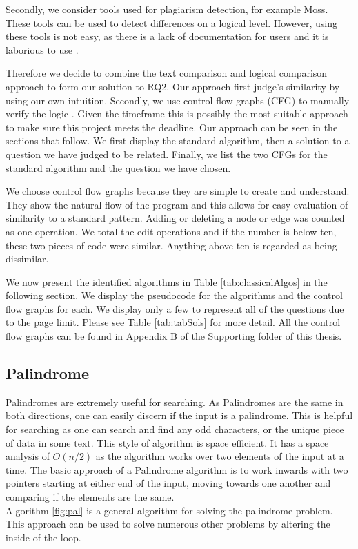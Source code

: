 \documentclass[conference]{IEEEtran}
\begin{document}
\par Secondly, we consider tools used for plagiarism detection, for example Moss. These tools can be used to detect differences on a logical level. However, using these tools is not easy, as there is a lack of documentation for users and it is laborious to use \cite{mosswebsite}. 
\par Therefore we decide to combine the text comparison and logical comparison approach to form our solution to RQ2. Our approach first judge's similarity by using our own intuition. Secondly, we use control flow graphs (CFG) to manually verify the logic \cite{softwaretesting}. Given the timeframe this is possibly the most suitable approach to make sure this project meets the deadline. Our approach can be seen in the sections that follow. We first display the standard algorithm, then a solution to a question we have judged to be related. Finally, we list the two CFGs for the standard algorithm and the question we have chosen. 
\par We choose control flow graphs because they are simple to create and understand. They show the natural flow of the program and this allows for easy evaluation of similarity to a standard pattern. Adding or deleting a node or edge was counted as one operation. We total the edit operations and if the number is below ten, these two pieces of code were similar. Anything above ten is regarded as being dissimilar.
\par We now present the identified algorithms in Table \ref{tab:classicalAlgos} in the following section. We display the pseudocode for the algorithms and the control flow graphs for each. We display only a few to represent all of the questions due to the page limit. Please see Table \ref{tab:tabSols} for more detail. All the control flow graphs can be found in Appendix B of the Supporting folder of this thesis.
\subsection{Palindrome}
Palindromes are extremely useful for searching. As Palindromes are the same in both directions, one can easily discern if the input is a palindrome. This is helpful for searching as one can search and find any odd characters, or the unique piece of data in some text. This style of algorithm is space efficient. It has a space analysis of $O(n/2)$ as the algorithm works over two elements of the input at a time. The basic approach of a Palindrome algorithm is to work inwards with two pointers starting at either end of the input, moving towards one another and comparing if the elements are the same.\\ 
Algorithm \ref{fig:pal} is a general algorithm for solving the palindrome problem. This approach can be used to solve numerous other problems by altering the inside of the loop.
\end{document}
